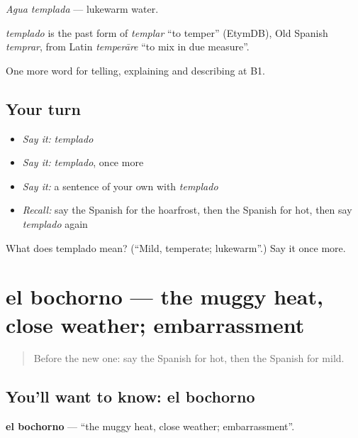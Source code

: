 \emph{Agua templada} — lukewarm water.

\begin{cousinweb}
\emph{templado} is the past form of \emph{templar} \textquotedblleft{}to temper\textquotedblright{} (EtymDB), Old Spanish \emph{temprar}, from Latin \emph{temperāre} \textquotedblleft{}to mix in due measure\textquotedblright{}.
\end{cousinweb}

\begin{grammarlens}[title={What you've built}]
One more word for telling, explaining and describing at B1.
\end{grammarlens}

\subsection*{Your turn}
\begin{itemize}
\raggedright
  \item \emph{Say it:} \emph{templado}
  \item \emph{Say it:} \emph{templado}, once more
  \item \emph{Say it:} a sentence of your own with \emph{templado}
  \item \emph{Recall:} say the Spanish for the hoarfrost, then the Spanish for hot, then say \emph{templado} again
\end{itemize}

\begin{tcolorbox}[breakable,colback=teal!4,colframe=teal!35!black,title={Before you move on}]
What does templado mean? (\textquotedblleft{}Mild, temperate; lukewarm\textquotedblright{}.) Say it once more.
\end{tcolorbox}
\section[el bochorno]{el bochorno — the muggy heat, close weather; embarrassment}

\label{lesson:ES-C701-bochorno}



\begin{quote}
Before the new one: say the Spanish for hot, then the Spanish for mild.
\end{quote}

\subsection*{You'll want to know: el bochorno}
\textbf{el bochorno} — \textquotedblleft{}the muggy heat, close weather; embarrassment\textquotedblright{}.

